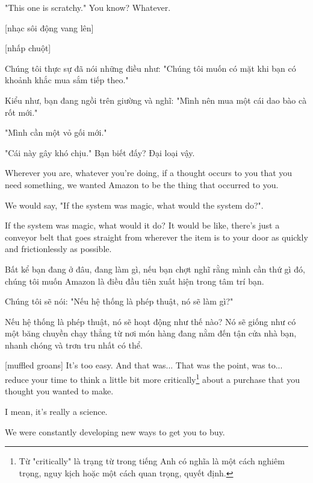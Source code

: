 \documentclass[a4paper]{article}
\begin{document}
	"This one is scratchy." You know? Whatever.
	
	\begin{vietnamese-v2}
		
		[nhạc sôi động vang lên] 
		
		[nhấp chuột] 
		
		Chúng tôi thực sự đã nói những điều như: "Chúng tôi muốn có mặt khi bạn có khoảnh khắc mua sắm tiếp theo." 
		
		Kiểu như, bạn đang ngồi trên giường và nghĩ: "Mình nên mua một cái dao bào cà rốt mới." 
		
		"Mình cần một vỏ gối mới." 
		
		"Cái này gây khó chịu." Bạn biết đấy? Đại loại vậy.
	\end{vietnamese-v2}
	
	Wherever you are, whatever you're doing, if a thought occurs to you that you need something, we wanted Amazon to be the thing that occurred to you.
	
	We would say, "If the system was magic, what would the system do?".
	
	If the system was magic, what would it do? It would be like, there's just a conveyor belt that goes straight from wherever the item is to your door as quickly and frictionlessly as possible.
	
	
	\begin{vietnamese-v2}
		Bất kể bạn đang ở đâu, đang làm gì, nếu bạn chợt nghĩ rằng mình cần thứ gì đó, chúng tôi muốn Amazon là điều đầu tiên xuất hiện trong tâm trí bạn. 
		
		Chúng tôi sẽ nói: "Nếu hệ thống là phép thuật, nó sẽ làm gì?" 
		
		Nếu hệ thống là phép thuật, nó sẽ hoạt động như thế nào? Nó sẽ giống như có một băng chuyền chạy thẳng từ nơi món hàng đang nằm đến tận cửa nhà bạn, nhanh chóng và trơn tru nhất có thể.
	\end{vietnamese-v2}
	
	[muffled groans]
	It's too easy. And that was... That was the point, was to... reduce your time to think a little bit more critically\footnote{
		Từ "critically" là trạng từ trong tiếng Anh có nghĩa là một cách nghiêm trọng, nguy kịch hoặc một cách quan trọng, quyết định.
	
	} about a purchase that you thought you wanted to make.
	
	I mean, it's really a science.
	
	We were constantly developing new ways to get you to buy.
	
\end{document}

